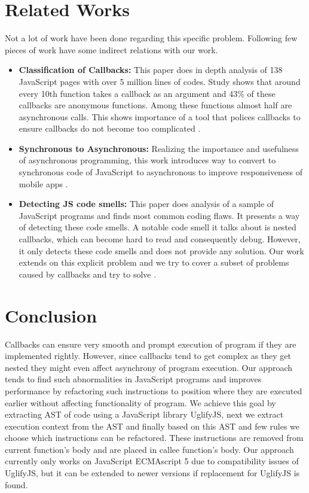 \documentclass[10pt,conference]{IEEEtran}
\begin{document}
\section{Related Works}
Not a lot of work have been done regarding this specific problem. Following few pieces of work have some indirect relations with our work. 
\begin{itemize}
	\item {\textbf{Classification of Callbacks:}
		This paper does in depth analysis of 138 JavaScript pages with over 5 million 
		lines of codes. Study shows that around every 10th function takes a callback as an argument and 43\% of these callbacks are anonymous functions. Among these functions almost half are asynchronous calls. This shows importance of a tool that polices callbacks to ensure callbacks do not become too complicated \cite{b3}. 
	}
	\item{\textbf{Synchronous to Asynchronous:}
		Realizing the importance and usefulness of asynchronous programming, this work introduces way to convert to synchronous code of JavaScript to asynchronous to improve responsiveness of mobile apps \cite{b1}. 
	}
	\item{\textbf{Detecting JS code smells:}
		This paper does analysis of a sample of JavaScript programs and finds most common coding flaws. It presents a way of detecting these code smells. A notable code smell it talks about is nested callbacks, which can become hard to read and consequently debug. However, it only detects these code smells and does not provide any solution. Our work extends on this explicit problem and we try to cover a subset of problems caused by callbacks and try to solve \cite{b2}. 
	}
\end{itemize}
\section{Conclusion}
Callbacks can ensure very smooth and prompt execution of program if they are implemented rightly. However, since callbacks tend to get complex as they get nested they might even affect asynchrony of program execution. Our approach tends to find such abnormalities in JavaScript programs and improves performance by refactoring such instructions to position where they are executed earlier without affecting functionality of program. We achieve this goal by extracting AST of code using a JavaScript library UglifyJS, next we extract execution context from the AST and finally based on this AST and few rules we choose which instructions can be refactored. These instructions are removed from current function’s body and are placed in callee function’s body. Our approach currently only works on JavaScript ECMAscript 5 due to compatibility issues of UglifyJS, but it can be extended to newer versions if replacement for UglifyJS is found. 
\end{document}
